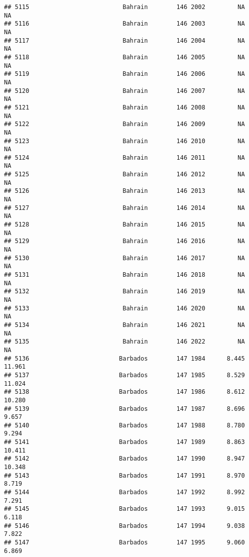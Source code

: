 \documentclass[
]{article}
\begin{document}
\begin{verbatim}
## 5115                          Bahrain        146 2002         NA         NA
## 5116                          Bahrain        146 2003         NA         NA
## 5117                          Bahrain        146 2004         NA         NA
## 5118                          Bahrain        146 2005         NA         NA
## 5119                          Bahrain        146 2006         NA         NA
## 5120                          Bahrain        146 2007         NA         NA
## 5121                          Bahrain        146 2008         NA         NA
## 5122                          Bahrain        146 2009         NA         NA
## 5123                          Bahrain        146 2010         NA         NA
## 5124                          Bahrain        146 2011         NA         NA
## 5125                          Bahrain        146 2012         NA         NA
## 5126                          Bahrain        146 2013         NA         NA
## 5127                          Bahrain        146 2014         NA         NA
## 5128                          Bahrain        146 2015         NA         NA
## 5129                          Bahrain        146 2016         NA         NA
## 5130                          Bahrain        146 2017         NA         NA
## 5131                          Bahrain        146 2018         NA         NA
## 5132                          Bahrain        146 2019         NA         NA
## 5133                          Bahrain        146 2020         NA         NA
## 5134                          Bahrain        146 2021         NA         NA
## 5135                          Bahrain        146 2022         NA         NA
## 5136                         Barbados        147 1984      8.445     11.961
## 5137                         Barbados        147 1985      8.529     11.024
## 5138                         Barbados        147 1986      8.612     10.280
## 5139                         Barbados        147 1987      8.696      9.657
## 5140                         Barbados        147 1988      8.780      9.294
## 5141                         Barbados        147 1989      8.863     10.411
## 5142                         Barbados        147 1990      8.947     10.348
## 5143                         Barbados        147 1991      8.970      8.719
## 5144                         Barbados        147 1992      8.992      7.291
## 5145                         Barbados        147 1993      9.015      6.118
## 5146                         Barbados        147 1994      9.038      7.822
## 5147                         Barbados        147 1995      9.060      6.869

\end{verbatim}
\end{document}
